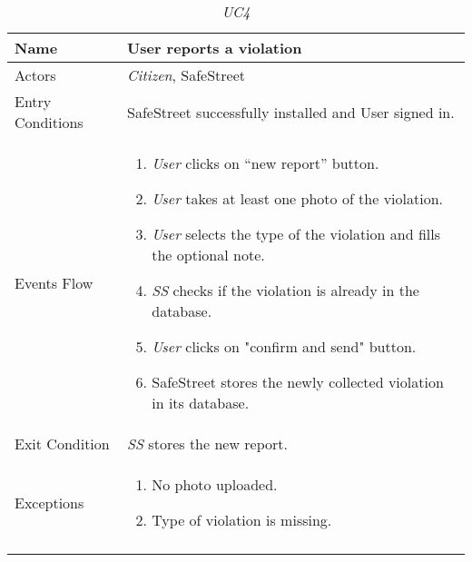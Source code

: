 \documentclass[../../../RASD.tex]{subfiles}
\begin{document}
    \begin{center}
        \begin{longtable}{| p{.35\linewidth} | p{.65\linewidth} |}
            \hline
            \textbf{Name} & \textbf{User reports a violation}\\ \hline
            Actors & \textit{Citizen}, SafeStreet\\ \hline
            Entry Conditions & SafeStreet successfully installed and User signed in.\\ \hline
            Events Flow &
            \begin{enumerate}
                \item \textit{User} clicks on “new report” button.
                \item \textit{User} takes at least one photo of the violation.
                \item \textit{User} selects the type of the violation and fills the optional note.
                \item \textit{SS} checks if the violation is already in the database.
                \item \textit{User} clicks on "confirm and send" button.
                \item SafeStreet stores the newly collected violation in its database.
            \end{enumerate}
            \\ \hline
            Exit Condition & \textit{SS} stores the new report.\\ \hline
            Exceptions &
            \begin{enumerate}
                \item No photo uploaded.
                \item Type of violation is missing.
            \end{enumerate}
             \\
            \hline
            \caption{\textit{UC4}}
        \end{longtable}
    \end{center}
    \newpage
\end{document}
